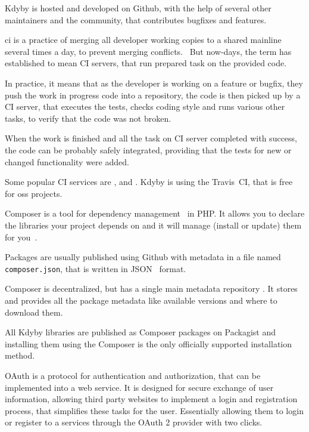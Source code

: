 Kdyby is hosted and developed on Github, with the help of several other maintainers and the community, that contributes bugfixes and features.

 \label{sec:theory:ci}

\gls{ci} is a practice of merging all developer working copies to a shared mainline several times a day, to prevent merging conflicts.~\cite{wiki:ci} But now-days, the term has established to mean CI servers, that run prepared task on the provided code.

In practice, it means that as the developer is working on a feature or bugfix, they push the work in progress code into a repository, the code is then picked up by a CI server, that executes the tests, checks coding style and runs various other tasks, to verify that the code was not broken.

When the work is finished and all the task on CI server completed with success, the code can be probably safely integrated, providing that the tests for new or changed functionality were added.

Some popular CI services are ,  and . Kdyby is using the Travis~CI, that is free for \gls{oss} projects.

 \label{sec:theory:composer}

Composer is a tool for dependency management~\cite{wiki:package-manager} in PHP. It allows you to declare the libraries your project depends on and it will manage (install or update) them for you~\cite{composer:docs:intro}.

Packages are usually published using Github with metadata in a file named \lstinline{composer.json}, that is written in JSON~\cite{wiki:json} format.

Composer is decentralized, but has a single main metadata repository . It stores and provides all the package metadata like available versions and where to download them.

All Kdyby libraries are published as Composer packages on Packagist and installing them using the Composer is the only officially supported installation method.

 \label{sec:theory:oauth2}

OAuth is a protocol for authentication and authorization, that can be implemented into a web service. It is designed for secure exchange of user information, allowing third party websites to implement a login and registration process, that simplifies these tasks for the user. Essentially allowing them to login or register to a services through the OAuth 2 provider with two clicks.

